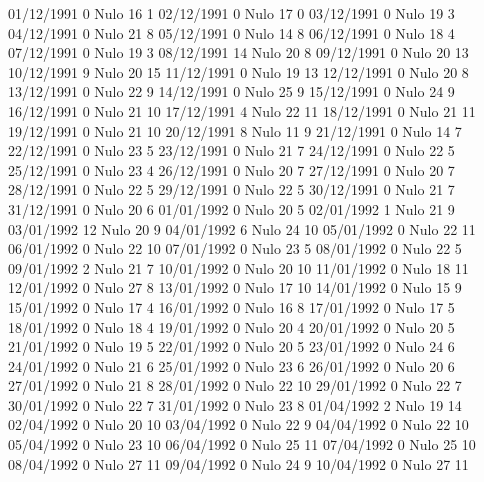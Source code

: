 01/12/1991  0     Nulo    16     1 
02/12/1991  0     Nulo    17     0 
03/12/1991  0     Nulo    19     3 
04/12/1991  0     Nulo    21     8 
05/12/1991  0     Nulo    14     8 
06/12/1991  0     Nulo    18     4 
07/12/1991  0     Nulo    19     3 
08/12/1991  14    Nulo    20     8 
09/12/1991  0     Nulo    20     13 
10/12/1991  9     Nulo    20     15 
11/12/1991  0     Nulo    19     13 
12/12/1991  0     Nulo    20     8 
13/12/1991  0     Nulo    22     9 
14/12/1991  0     Nulo    25     9 
15/12/1991  0     Nulo    24     9 
16/12/1991  0     Nulo    21     10 
17/12/1991  4     Nulo    22     11 
18/12/1991  0     Nulo    21     11 
19/12/1991  0     Nulo    21     10 
20/12/1991  8     Nulo    11     9 
21/12/1991  0     Nulo    14     7 
22/12/1991  0     Nulo    23     5 
23/12/1991  0     Nulo    21     7 
24/12/1991  0     Nulo    22     5 
25/12/1991  0     Nulo    23     4 
26/12/1991  0     Nulo    20     7 
27/12/1991  0     Nulo    20     7 
28/12/1991  0     Nulo    22     5 
29/12/1991  0     Nulo    22     5 
30/12/1991  0     Nulo    21     7 
31/12/1991  0     Nulo    20     6 
01/01/1992  0     Nulo    20     5 
02/01/1992  1     Nulo    21     9 
03/01/1992  12    Nulo    20     9 
04/01/1992  6     Nulo    24     10 
05/01/1992  0     Nulo    22     11 
06/01/1992  0     Nulo    22     10 
07/01/1992  0     Nulo    23     5 
08/01/1992  0     Nulo    22     5 
09/01/1992  2     Nulo    21     7 
10/01/1992  0     Nulo    20     10 
11/01/1992  0     Nulo    18     11 
12/01/1992  0     Nulo    27     8 
13/01/1992  0     Nulo    17     10 
14/01/1992  0     Nulo    15     9 
15/01/1992  0     Nulo    17     4 
16/01/1992  0     Nulo    16     8 
17/01/1992  0     Nulo    17     5 
18/01/1992  0     Nulo    18     4 
19/01/1992  0     Nulo    20     4 
20/01/1992  0     Nulo    20     5 
21/01/1992  0     Nulo    19     5 
22/01/1992  0     Nulo    20     5 
23/01/1992  0     Nulo    24     6 
24/01/1992  0     Nulo    21     6 
25/01/1992  0     Nulo    23     6 
26/01/1992  0     Nulo    20     6 
27/01/1992  0     Nulo    21     8 
28/01/1992  0     Nulo    22     10 
29/01/1992  0     Nulo    22     7 
30/01/1992  0     Nulo    22     7 
31/01/1992  0     Nulo    23     8 
01/04/1992  2     Nulo    19     14 
02/04/1992  0     Nulo    20     10 
03/04/1992  0     Nulo    22     9 
04/04/1992  0     Nulo    22     10 
05/04/1992  0     Nulo    23     10 
06/04/1992  0     Nulo    25     11 
07/04/1992  0     Nulo    25     10 
08/04/1992  0     Nulo    27     11 
09/04/1992  0     Nulo    24     9 
10/04/1992  0     Nulo    27     11 
